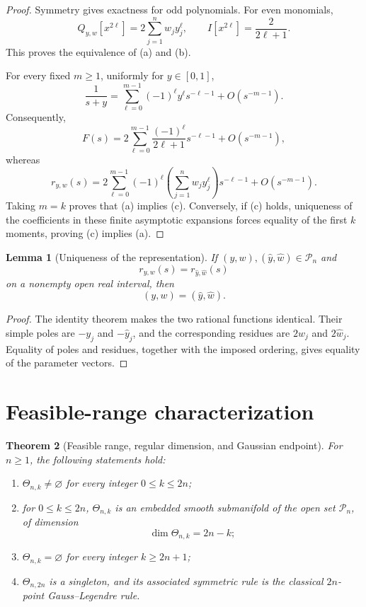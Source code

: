 \documentclass[preprint,12pt]{elsarticle}
\newtheorem{theorem}{Theorem}
\newtheorem{lemma}[theorem]{Lemma}
\theoremstyle{remark}
\begin{document}
\begin{proof}
Symmetry gives exactness for odd polynomials. For even monomials,
\[
Q_{y,w}[x^{2\ell}]
=
2\sum_{j=1}^{n}w_jy_j^\ell,
\qquad
I[x^{2\ell}]
=
\frac{2}{2\ell+1}.
\]
This proves the equivalence of (a) and (b).

For every fixed \(m\geq1\), uniformly for \(y\in[0,1]\),
\[
\frac{1}{s+y}
=
\sum_{\ell=0}^{m-1}
(-1)^\ell y^\ell s^{-\ell-1}
+
O(s^{-m-1}).
\]
Consequently,
\[
F(s)
=
2\sum_{\ell=0}^{m-1}
\frac{(-1)^\ell}{2\ell+1}s^{-\ell-1}
+
O(s^{-m-1}),
\]
whereas
\[
r_{y,w}(s)
=
2\sum_{\ell=0}^{m-1}
(-1)^\ell
\left(\sum_{j=1}^{n}w_jy_j^\ell\right)
s^{-\ell-1}
+
O(s^{-m-1}).
\]
Taking \(m=k\) proves that (a) implies (c). Conversely, if (c) holds,
uniqueness of the coefficients in these finite asymptotic expansions
forces equality of the first \(k\) moments, proving (c) implies (a).
\end{proof}

\begin{lemma}[Uniqueness of the representation]
If \((y,w),(\widehat y,\widehat w)\in\mathcal P_n\) and
\[
r_{y,w}(s)=r_{\widehat y,\widehat w}(s)
\]
on a nonempty open real interval, then
\[
(y,w)=(\widehat y,\widehat w).
\]
\end{lemma}

\begin{proof}
The identity theorem makes the two rational functions identical. Their
simple poles are \(-y_j\) and \(-\widehat y_j\), and the corresponding
residues are \(2w_j\) and \(2\widehat w_j\). Equality of poles and
residues, together with the imposed ordering, gives equality of the
parameter vectors.
\end{proof}

\section{Feasible-range characterization}

\begin{theorem}[Feasible range, regular dimension, and Gaussian endpoint]
For \(n\geq1\), the following statements hold:
\begin{enumerate}[label=(\roman*)]
\item \(\Theta_{n,k}\neq\varnothing\) for every integer
\(0\leq k\leq2n\);
\item for \(0\leq k\leq2n\), \(\Theta_{n,k}\) is an embedded smooth
submanifold of the open set \(\mathcal P_n\), of dimension
\[
\dim\Theta_{n,k}=2n-k;
\]
\item \(\Theta_{n,k}=\varnothing\) for every integer \(k\geq2n+1\);
\item \(\Theta_{n,2n}\) is a singleton, and its associated symmetric
rule is the classical \(2n\)-point Gauss--Legendre rule.
\end{enumerate}
\end{theorem}
\end{document}
